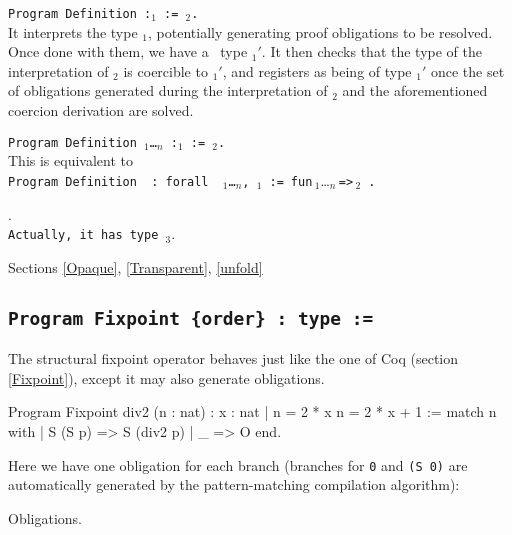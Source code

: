 \begin{Variants}
\item {\tt Program Definition {\ident} {\tt :}{\term$_1$} :=
    {\term$_2$}.}\\
  It interprets the type {\term$_1$}, potentially generating proof
  obligations to be resolved. Once done with them, we have a \Coq\ type
  {\term$_1'$}. It then checks that the type of the interpretation of
  {\term$_2$} is coercible to {\term$_1'$}, and registers {\ident} as
  being of type {\term$_1'$} once the set of obligations generated
  during the interpretation of {\term$_2$} and the aforementioned
  coercion derivation are solved.
\item {\tt Program Definition {\ident} {\binder$_1$}\ldots{\binder$_n$}
       {\tt :}\term$_1$ {\tt :=} {\term$_2$}.}\\
  This is equivalent to \\
   {\tt Program Definition\,{\ident}\,{\tt :\,forall}\,%
       {\binder$_1$}\ldots{\binder$_n$}{\tt ,}\,\term$_1$\,{\tt :=}}\,%
       {\tt fun}\,{\binder$_1$}\ldots{\binder$_n$}\,{\tt =>}\,{\term$_2$}\,%
       {\tt .}
\end{Variants}

\begin{ErrMsgs}
\item {}.\\
    \texttt{Actually, it has type {\term$_3$}}.
\end{ErrMsgs}

\SeeAlso Sections \ref{Opaque}, \ref{Transparent}, \ref{unfold}

\subsection{\tt Program Fixpoint {\ident} {\params} {\tt \{order\}} : type := \term
  \label{ProgramFixpoint}}

The structural fixpoint operator behaves just like the one of Coq
(section \ref{Fixpoint}), except it may also generate obligations.

\begin{coq_example}
Program Fixpoint div2 (n : nat) : { x : nat | n = 2 * x \/ n = 2 * x + 1 } :=
  match n with
  | S (S p) => S (div2 p)
  | _ => O
  end.
\end{coq_example}

Here we have one obligation for each branch (branches for \verb:0: and \verb:(S 0): are
automatically generated by the pattern-matching compilation algorithm):
\begin{coq_example}
  Obligations.
\end{coq_example}

